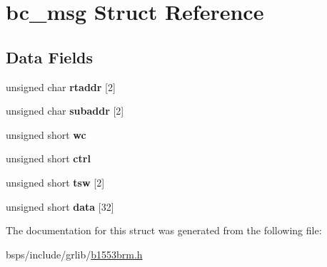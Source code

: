 \hypertarget{structbc__msg}{}\section{bc\+\_\+msg Struct Reference}
\label{structbc__msg}
\subsection*{Data Fields}
\begin{DoxyCompactItemize}
\item 
\mbox{\label{structbc__msg_a13f3d2ad995d4cc4056220d754eaee44}} 
unsigned char {\bfseries rtaddr} \mbox{[}2\mbox{]}
\item 
\mbox{\label{structbc__msg_aa8db5a99df2275f2d277bb6302f4a471}} 
unsigned char {\bfseries subaddr} \mbox{[}2\mbox{]}
\item 
\mbox{\label{structbc__msg_a9b44910d937734bfa2a593fc713a7894}} 
unsigned short {\bfseries wc}
\item 
\mbox{\label{structbc__msg_a1ca65a57127a0bec362deb86b858c379}} 
unsigned short {\bfseries ctrl}
\item 
\mbox{\label{structbc__msg_a3cd50a6612ba4bdbd5429dbb2c6d14e8}} 
unsigned short {\bfseries tsw} \mbox{[}2\mbox{]}
\item 
\mbox{\label{structbc__msg_a97dff01972316373059e006bfccf8bee}} 
unsigned short {\bfseries data} \mbox{[}32\mbox{]}
\end{DoxyCompactItemize}


The documentation for this struct was generated from the following file\+:\begin{DoxyCompactItemize}
\item 
bsps/include/grlib/\mbox{\hyperlink{b1553brm_8h}{b1553brm.\+h}}\end{DoxyCompactItemize}
